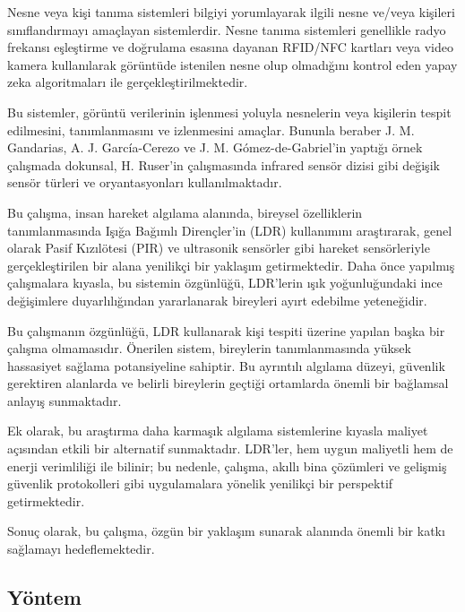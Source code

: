 Nesne veya kişi tanıma sistemleri bilgiyi yorumlayarak ilgili nesne ve/veya kişileri sınıflandırmayı amaçlayan sistemlerdir. Nesne tanıma sistemleri genellikle radyo frekansı eşleştirme ve doğrulama esasına dayanan RFID/NFC kartları veya video kamera kullanılarak görüntüde istenilen nesne olup olmadığını kontrol eden yapay zeka algoritmaları ile gerçekleştirilmektedir. 

Bu sistemler, görüntü verilerinin işlenmesi yoluyla nesnelerin veya kişilerin tespit edilmesini, tanımlanmasını ve izlenmesini amaçlar. Bununla beraber J. M. Gandarias, A. J. García-Cerezo ve J. M. Gómez-de-Gabriel'in yaptığı örnek çalışmada \cite{CNN_object} dokunsal, H. Ruser'in çalışmasında \cite{IoTBig} infrared sensör dizisi gibi değişik sensör türleri ve oryantasyonları kullanılmaktadır.  

Bu çalışma, insan hareket algılama alanında, bireysel özelliklerin tanımlanmasında Işığa Bağımlı Dirençler'in (LDR) kullanımını araştırarak, genel olarak Pasif Kızılötesi (PIR) ve ultrasonik sensörler gibi hareket sensörleriyle gerçekleştirilen bir alana yenilikçi bir yaklaşım getirmektedir. Daha önce yapılmış çalışmalara kıyasla, bu sistemin özgünlüğü, LDR'lerin ışık yoğunluğundaki ince değişimlere duyarlılığından yararlanarak bireyleri ayırt edebilme yeteneğidir.

Bu çalışmanın özgünlüğü, LDR kullanarak kişi tespiti üzerine yapılan başka bir çalışma olmamasıdır. Önerilen sistem, bireylerin tanımlanmasında yüksek hassasiyet sağlama potansiyeline sahiptir. Bu ayrıntılı algılama düzeyi, güvenlik gerektiren alanlarda ve belirli bireylerin geçtiği ortamlarda önemli bir bağlamsal anlayış sunmaktadır.

Ek olarak, bu araştırma daha karmaşık algılama sistemlerine kıyasla maliyet açısından etkili bir alternatif sunmaktadır. LDR'ler, hem uygun maliyetli hem de enerji verimliliği ile bilinir; bu nedenle, çalışma, akıllı bina çözümleri ve gelişmiş güvenlik protokolleri gibi uygulamalara yönelik yenilikçi bir perspektif getirmektedir.

Sonuç olarak, bu çalışma, özgün bir yaklaşım sunarak alanında önemli bir katkı sağlamayı hedeflemektedir.

\subsection{Yöntem}

\begin{comment}
Tasarım ve Bitirme projesinin tüm aşamalarında (fikrin oluşması,
literatür taraması, tasarım, simülasyon ve gerçekleme) hangi yöntemlerin
nasıl kullanılacağı bu başlık altında kısaca açıklanmalıdır. Detayları
ise ilgili kısımlara ait başlıklar altında verilmelidir.
\end{comment}

